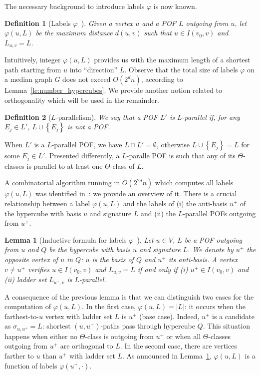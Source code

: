 \documentclass{article}
\newtheorem{definition}{Definition}
\newtheorem{lemma}{Lemma}
\newcommand{\set}[1]{\left\{ #1 \right\}}
\newcommand{\card}[1]{\left| #1 \right|}
\begin{document}
The necessary background to introduce labels $\varphi$ is now known.

\begin{definition}[Labels $\varphi$~\cite{BeHa21}]
Given a vertex $u$ and a POF $L$ outgoing from $u$, let $\varphi(u,L)$ be the maximum distance $d(u,v)$ such that $u \in I(v_0,v)$ and $L_{u,v} = L$.
\label{def:varphi}
\end{definition}

Intuitively, integer $\varphi(u,L)$ provides us with the maximum length of a shortest path starting from $u$ into ``direction'' $L$. Observe that the total size of labels $\varphi$ on a median graph $G$ does not exceed $O(2^dn)$, according to Lemma~\ref{le:number_hypercubes}. We provide another notion related to orthogonality which will be used in the remainder.

\begin{definition}[$L$-parallelism]
We say that a POF $L'$ is $L$-\emph{parallel} if, for any $E_j \in L'$, $L \cup \set{E_j}$ is not a POF.
\label{def:pof_parallel}
\end{definition}

When $L'$ is a $L$-parallel POF, we have $L \cap L' = \emptyset$, otherwise $L \cup \set{E_j} = L$ for some $E_j \in L'$. Presented differently, a $L$-paralle POF is such that any of its $\Theta$-classes is parallel to at least one $\Theta$-class of $L$.

A combinatorial algorithm running in $\tilde{O}(2^{2d}n)$ which computes all labels $\varphi(u,L)$ was identified in~\cite{BeHa21}: we provide an overview of it. There is a crucial relationship between a label $\varphi(u,L)$ and the labels of (i) the anti-basis $u^+$ of the hypercube with basis $u$ and signature $L$ and (ii) the $L$-parallel POFs outgoing from $u^+$.

\begin{lemma}[Inductive formula for labels $\varphi$~\cite{BeHa21}]
Let $u \in V$, $L$ be a POF outgoing from $u$ and $Q$ be the hypercube with basis $u$ and signature $L$. We denote by $u^+$ the opposite vertex of $u$ in $Q$: $u$ is the basis of $Q$ and $u^+$ its anti-basis. A vertex $v\neq u^+$ verifies $u \in I(v_0,v)$ and $L_{u,v} = L$ if and only if (i) $u^+ \in I(v_0,v)$ and (ii) ladder set $L_{u^+,v}$ is $L$-parallel.
\label{le:pushing_phi}
\end{lemma}

A consequence of the previous lemma is that we can distinguish two cases for the computation of $\varphi(u,L)$. In the first case, $\varphi(u,L) = \card{L}$: it occurs when the farthest-to-$u$ vertex with ladder set $L$ is $u^+$ (base case). Indeed, $u^+$ is a candidate as $\sigma_{u,u^+} = L$: shortest $(u,u^+)$-paths pass through hypercube $Q$. This situation happens when either no $\Theta$-class is outgoing from $u^+$ or when all $\Theta$-classes outgoing from $u^+$ are orthogonal to $L$. In the second case, there are vertices farther to $u$ than $u^+$ with ladder set $L$. As announced in Lemma~\ref{le:pushing_phi}, $\varphi(u,L)$ is a function of labels $\varphi(u^+,\cdot)$.
\end{document}

